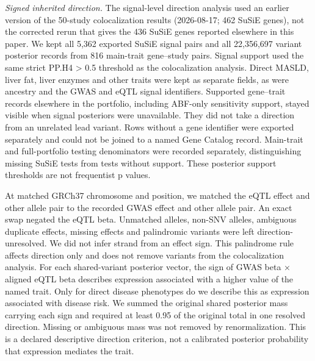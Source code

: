 \emph{Signed inherited direction.} The signal-level direction analysis used an earlier version of the 50-study colocalization results (2026-08-17; 462 SuSiE genes), not the corrected rerun that gives the 436 SuSiE genes reported elsewhere in this paper. We kept all 5,362 exported SuSiE signal pairs and all 22,356,697 variant posterior records from 816 main-trait gene--study pairs. Signal support used the same strict PP.H4 \textgreater{} 0.5 threshold as the colocalization analysis. Direct MASLD, liver fat, liver enzymes and other traits were kept as separate fields, as were ancestry and the GWAS and eQTL signal identifiers. Supported gene--trait records elsewhere in the portfolio, including ABF-only sensitivity support, stayed visible when signal posteriors were unavailable. They did not take a direction from an unrelated lead variant. Rows without a gene identifier were exported separately and could not be joined to a named Gene Catalog record. Main-trait and full-portfolio testing denominators were recorded separately, distinguishing missing SuSiE tests from tests without support. These posterior support thresholds are not frequentist p values.

At matched GRCh37 chromosome and position, we matched the eQTL effect and other allele pair to the recorded GWAS effect and other allele pair. An exact swap negated the eQTL beta. Unmatched alleles, non-SNV alleles, ambiguous duplicate effects, missing effects and palindromic variants were left direction-unresolved. We did not infer strand from an effect sign. This palindrome rule affects direction only and does not remove variants from the colocalization analysis. For each shared-variant posterior vector, the sign of GWAS beta × aligned eQTL beta describes expression associated with a higher value of the named trait. Only for direct disease phenotypes do we describe this as expression associated with disease risk. We summed the original shared posterior mass carrying each sign and required at least 0.95 of the original total in one resolved direction. Missing or ambiguous mass was not removed by renormalization. This is a declared descriptive direction criterion, not a calibrated posterior probability that expression mediates the trait.

